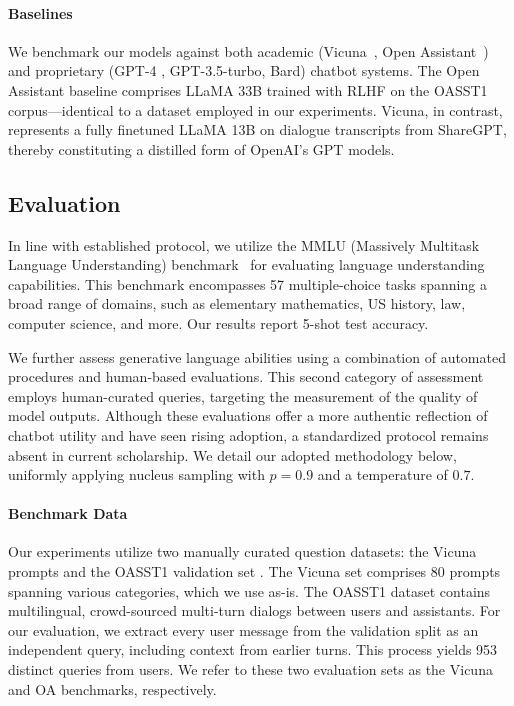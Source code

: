 \paragraph{Baselines} We benchmark our models against both academic (Vicuna~\citep{vicuna2023}, Open Assistant~\citep{kopf2023openassistant}) and proprietary (GPT-4 \citep{openai2023gpt}, GPT-3.5-turbo, Bard) chatbot systems. The Open Assistant baseline comprises LLaMA 33B trained with RLHF on the OASST1 corpus—identical to a dataset employed in our experiments. Vicuna, in contrast, represents a fully finetuned LLaMA 13B on dialogue transcripts from ShareGPT, thereby constituting a distilled form of OpenAI's GPT models.

\subsection{Evaluation}

In line with established protocol, we utilize the MMLU (Massively Multitask Language Understanding) benchmark~\citep{hendrycksmeasuring} for evaluating language understanding capabilities. This benchmark encompasses 57 multiple-choice tasks spanning a broad range of domains, such as elementary mathematics, US history, law, computer science, and more. Our results report 5-shot test accuracy.

We further assess generative language abilities using a combination of automated procedures and human-based evaluations. This second category of assessment employs human-curated queries, targeting the measurement of the quality of model outputs. Although these evaluations offer a more authentic reflection of chatbot utility and have seen rising adoption, a standardized protocol remains absent in current scholarship. We detail our adopted methodology below, uniformly applying nucleus sampling with $p=0.9$ and a temperature of $0.7$.

\paragraph{Benchmark Data} Our experiments utilize two manually curated question datasets: the Vicuna prompts \citep{vicuna2023} and the OASST1 validation set \citep{kopf2023openassistant}. The Vicuna set comprises 80 prompts spanning various categories, which we use as-is. The OASST1 dataset contains multilingual, crowd-sourced multi-turn dialogs between users and assistants. For our evaluation, we extract every user message from the validation split as an independent query, including context from earlier turns. This process yields 953 distinct queries from users. We refer to these two evaluation sets as the Vicuna and OA benchmarks, respectively.

